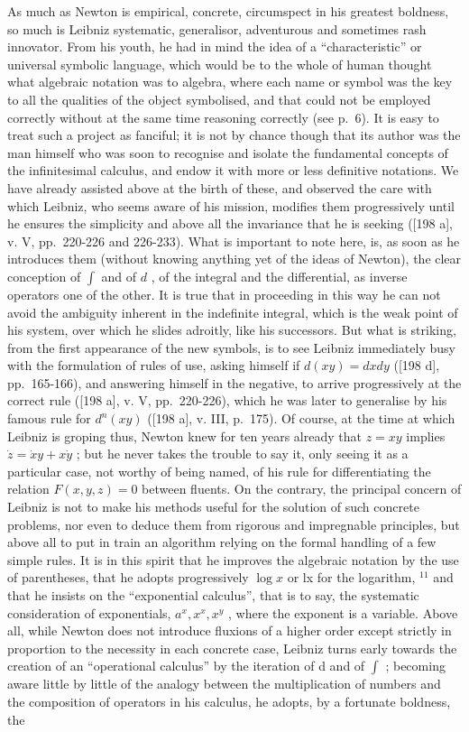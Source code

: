 As much as Newton is empirical, concrete, circumspect in his greatest boldness, so much is Leibniz systematic, generalisor, adventurous and sometimes rash innovator. From his youth, he had in mind the idea of a ``characteristic'' or universal symbolic language, which would be to the whole of human thought what algebraic notation was to algebra, where each name or symbol was the key to all the qualities of the object symbolised, and that could not be employed correctly without at the same time reasoning correctly (see p.~6). It is easy to treat such a project as fanciful; it is not by chance though that its author was the man himself who was soon to recognise and isolate the fundamental concepts of the infinitesimal calculus, and endow it with more or less definitive notations. We have already assisted above at the birth of these, and observed the care with which Leibniz, who seems aware of his mission, modifies them progressively until he ensures the simplicity and above all the invariance that he is seeking ({[}198 a{]}, v. V, pp.~220-226 and 226-233). What is important to note here, is, as soon as he introduces them (without knowing anything yet of the ideas of Newton), the clear conception of \(\int\) and of \(d\) , of the integral and the differential, as inverse operators one of the other. It is true that in proceeding in this way he can not avoid the ambiguity inherent in the indefinite integral, which is the weak point of his system, over which he slides adroitly, like his successors. But what is striking, from the first appearance of the new symbols, is to see Leibniz immediately busy with the formulation of rules of use, asking himself if \(d(xy) = dxdy\) ({[}198 d{]}, pp.~165-166), and answering himself in the negative, to arrive progressively at the correct rule ({[}198 a{]}, v. V, pp.~220-226), which he was later to generalise by his famous rule for \(d^n(xy)\) ({[}198 a{]}, v. III, p.~175). Of course, at the time at which Leibniz is groping thus, Newton knew for ten years already that \(z = xy\) implies \(\dot{z} = \dot{x}y + x\dot{y}\) ; but he never takes the trouble to say it, only seeing it as a particular case, not worthy of being named, of his rule for differentiating the relation \(F(x,y,z) = 0\) between fluents. On the contrary, the principal concern of Leibniz is not to make his methods useful for the solution of such concrete problems, nor even to deduce them from rigorous and impregnable principles, but above all to put in train an algorithm relying on the formal handling of a few simple rules. It is in this spirit that he improves the algebraic notation by the use of parentheses, that he adopts progressively \(\log x\) or lx for the logarithm, \(^{11}\) and that he insists on the ``exponential calculus'', that is to say, the systematic consideration of exponentials, \(a^{x}, x^{x}, x^{y}\) , where the exponent is a variable. Above all, while Newton does not introduce fluxions of a higher order except strictly in proportion to the necessity in each concrete case, Leibniz turns early towards the creation of an ``operational calculus'' by the iteration of d and of \(\int\) ; becoming aware little by little of the analogy between the multiplication of numbers and the composition of operators in his calculus, he adopts, by a fortunate boldness, the 